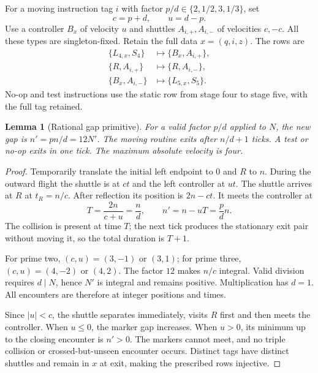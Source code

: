 \documentclass[11pt,letterpaper]{article}
\numberwithin{equation}{section}
\newtheorem{lemma}[theorem]{Lemma}
\theoremstyle{definition}
\theoremstyle{remark}
\begin{document}
For a moving instruction tag $i$ with factor $p/d\in\{2,1/2,3,1/3\}$, set
\[
c=p+d,\qquad u=d-p.
\]
Use a controller $B_x$ of velocity $u$ and shuttles $A_{i,+},A_{i,-}$ of velocities $c,-c$. All these types are singleton-fixed. Retain the full data $x=(q,i,z)$. The rows are
\begin{align}
\{L_{4,x},S_4\}&\longmapsto\{B_x,A_{i,+}\},\\
\{R,A_{i,+}\}&\longmapsto\{R,A_{i,-}\},\\
\{B_x,A_{i,-}\}&\longmapsto\{L_{5,x},S_5\}.\label{smc:tm:eq:arithexit}
\end{align}
No-op and test instructions use the static row from stage four to stage five, with the full tag retained.

\begin{lemma}[Rational gap primitive]\label{smc:tm:lem:arithmetic}
For a valid factor $p/d$ applied to $N$, the new gap is $n'=pn/d=12N'$. The moving routine exits after $n/d+1$ ticks. A test or no-op exits in one tick. The maximum absolute velocity is four.
\end{lemma}
\begin{proof}
Temporarily translate the initial left endpoint to $0$ and $R$ to $n$. During the outward flight the shuttle is at $ct$ and the left controller at $ut$. The shuttle arrives at $R$ at $t_R=n/c$. After reflection its position is $2n-ct$. It meets the controller at
\[
T=\frac{2n}{c+u}=\frac nd,
\qquad n'=n-uT=\frac pd n.
\]
The collision is present at time $T$; the next tick produces the stationary exit pair without moving it, so the total duration is $T+1$.

For prime two, $(c,u)=(3,-1)$ or $(3,1)$; for prime three, $(c,u)=(4,-2)$ or $(4,2)$. The factor $12$ makes $n/c$ integral. Valid division requires $d\mid N$, hence $N'$ is integral and remains positive. Multiplication has $d=1$. All encounters are therefore at integer positions and times.

Since $|u|<c$, the shuttle separates immediately, visits $R$ first and then meets the controller. When $u\le0$, the marker gap increases. When $u>0$, its minimum up to the closing encounter is $n'>0$. The markers cannot meet, and no triple collision or crossed-but-unseen encounter occurs. Distinct tags have distinct shuttles and remain in $x$ at exit, making the prescribed rows injective.
\end{proof}
\end{document}
